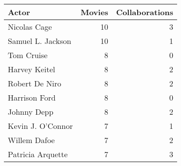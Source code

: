 \begin{tabular}{lrr}
\toprule
Actor & Movies & Collaborations \\
\midrule
Nicolas Cage & 10 & 3 \\
Samuel L. Jackson & 10 & 1 \\
Tom Cruise & 8 & 0 \\
Harvey Keitel & 8 & 2 \\
Robert De Niro & 8 & 2 \\
Harrison Ford & 8 & 0 \\
Johnny Depp & 8 & 2 \\
Kevin J. O'Connor & 7 & 1 \\
Willem Dafoe & 7 & 2 \\
Patricia Arquette & 7 & 3 \\
\bottomrule
\end{tabular}

